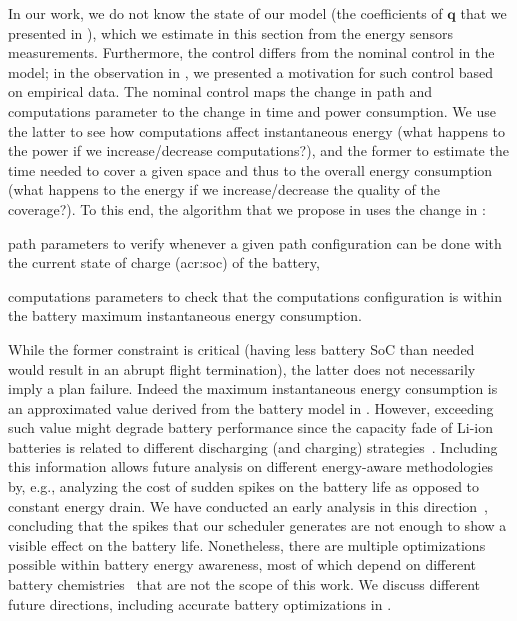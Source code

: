In our work, we do not know the state of our model (the coefficients of $\mathbf{q}$ that we presented in ), which we estimate in this section from the energy sensors measurements. Furthermore, the control differs from the nominal control in the model; in the observation in , we presented a motivation for such control based on empirical data. The nominal control maps the change in path and computations parameter to the change in time and power consumption. We use the latter to see how computations affect instantaneous energy (what happens to the power if we increase/decrease computations?), and the former to estimate the time needed to cover a given space and thus to the overall energy consumption (what happens to the energy if we increase/decrease the quality of the coverage?). To this end, the algorithm that we propose in  uses the change in :
\begin{enumerate*}[label={(\alph*)},font={\textit}]
  \item path parameters to verify whenever a given path configuration can be done with the current state of charge (\Gls{acr:soc}) of the battery,
  \item computations parameters to check that the computations configuration is within the battery maximum instantaneous energy consumption. 
\end{enumerate*}
While the former constraint is critical (having less battery SoC than needed would result in an abrupt flight termination), the latter does not necessarily imply a plan failure. Indeed the maximum instantaneous energy consumption is an approximated value derived from the battery model in . However, exceeding such value might degrade battery performance since the capacity fade of Li-ion batteries is related to different discharging (and charging) strategies~\citep{lv2020analysis,tian2019quantifying}. Including this information allows future analysis on different energy-aware methodologies by, e.g., analyzing the cost of sudden spikes on the battery life as opposed to constant energy drain. We have conducted an early analysis in this direction~\citep{seewald2019coarse}, concluding that the spikes that our scheduler generates are not enough to show a visible effect on the battery life. Nonetheless, there are multiple optimizations possible within battery energy awareness, most of which depend on different battery chemistries~\citep{tian2019quantifying} that are not the scope of this work. We discuss different future directions, including accurate battery optimizations in .

